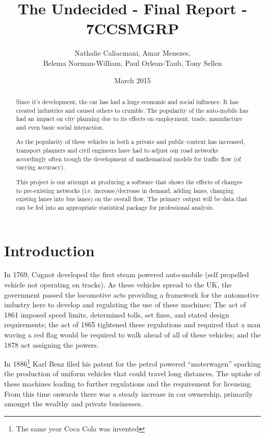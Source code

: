 \documentclass[titlepage]{article}
\title{The Undecided - Final Report - 7CCSMGRP}
\author{Nathalie Caliacmani, Amar Menezes, \\ Belema Norman-William, Paul Orlean-Taub, Tony Sellen}
\date{March 2015}
\begin{document}
\maketitle

\begin{abstract}
Since it's development, the car has had a huge economic and social influence. It has created industries and caused others to crumble. The popularity of the auto-mobile has had an impact on city planning due to its effects on employment, trade, manufacture and even basic social interaction.

As the popularity of these vehicles in both a private and public context has increased, transport planners and civil engineers have had to adjust our road networks accordingly often trough the development of mathematical models for traffic flow (of varying accuracy).

This project is our attempt at producing a software that shows the effects of changes to pre-existing networks (i.e. increase/decrease in demand, adding lanes, changing existing lanes into bus lanes) on the overall flow. The primary output will be data that can be fed into an appropriate statistical package for professional analysis.
\end{abstract}

\tableofcontents
\newpage

\section{Introduction}
	In 1769, Cugnot developed the first steam powered auto-mobile \cite{eckermann2001world} (self propelled vehicle not operating on tracks). As these vehicles spread to the UK, the government passed the locomotive acts providing a framework for the automotive industry here to develop and regulating the use of these machines; The act of 1861 imposed speed limits, determined tolls, set fines, and stated design requirements; the act of 1865 tightened these regulations and required that a man waving a red flag would be required to walk ahead of all of these vehicles; and the 1878 act assigning the powers.
	
	In 1886\footnote{The same year Coca Cola was invented} Karl Benz filed his patent for the petrol powered ``moterwagen'' \cite{benzpatent} sparking the production of uniform vehicles that could travel long distances. The uptake of these machines leading to further regulations and the requirement for licensing. From this time onwards there was a steady increase in car ownership, primarily amongst the wealthy and private businesses.
\end{document}
